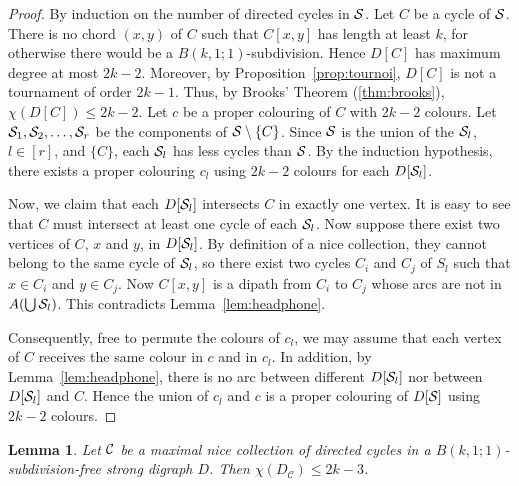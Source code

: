 \documentclass[utf8,10pt]{article}
\theoremstyle{plain}
\newtheorem{lemma}[theorem]{Lemma}
\theoremstyle{definition}
\theoremstyle{remark}
\begin{document}
\begin{proof}
By induction on the number of directed cycles in ${\cal S}$. Let $C$ be a cycle of ${\cal S}$. There is no chord $(x,y)$ of $C$
such that $C[x,y]$ has length at least $k$, for otherwise there would be a $B(k,1;1)$-subdivision. Hence $D[C]$ has maximum degree at most $2k-2$. Moreover, by Proposition~\ref{prop:tournoi}, $D[C]$ is not a tournament of order $2k-1$.
Thus, by Brooks' Theorem (\ref{thm:brooks}), $\chi(D[C])\leq 2k-2$.
 Let $c$ be a proper colouring of $C$ with $2k-2$ colours. Let ${\cal S}_1, {\cal S}_2, \dots, {\cal S}_r$ be the components of ${\cal S} \setminus \{C\}$. Since ${\cal S}$ is the union of the ${\cal S}_l$, $l\in [r]$, and $\{C\}$,
each ${\cal S}_l$ has less cycles than ${\cal S}$. By the induction hypothesis, there exists a proper colouring $c_l$ using $2k-2$ colours for each $D[{\cal S}_l]$.
 
Now, we claim that each $D[{\cal S}_l]$ intersects $C$ in exactly one vertex. It is easy to see that $C$ must intersect at least one cycle of each ${\cal S}_l$.
Now suppose there exist two vertices of $C$, $x$ and $y$, in $D[{\cal S}_l]$. By definition of a nice collection, they cannot belong to the same cycle 
of ${\cal S}_l$, so there exist two cycles $C_i$ and $C_j$ of $S_l$ such that $x \in C_i$ and $y \in C_j$. Now $C[x,y]$ is a dipath from $C_i$ to $C_j$ whose arcs are not in $A(\bigcup {\cal S}_l)$. This contradicts Lemma~\ref{lem:headphone}. 

Consequently, free to permute the colours of $c_l$,
we may assume that each vertex of $C$ receives the same colour in $c$ and in $c_l$. 
In addition, by Lemma~\ref{lem:headphone}, there is no arc between different $D[{\cal S}_l]$ nor between $D[{\cal S}_l]$ and $C$. Hence the union of 
$c_l$ and $c$ is a proper colouring of $D[{\cal S}]$ using $2k-2$ colours. 
\end{proof}


\begin{lemma}\label{lem:reduce}
Let ${\cal C}$ be a maximal nice collection of directed cycles in a $B(k,1;1)$-subdivision-free strong digraph $D$. Then $\chi(D_{\mathcal{C}}) \leq 2k-3$.
\end{lemma}
\end{document}
